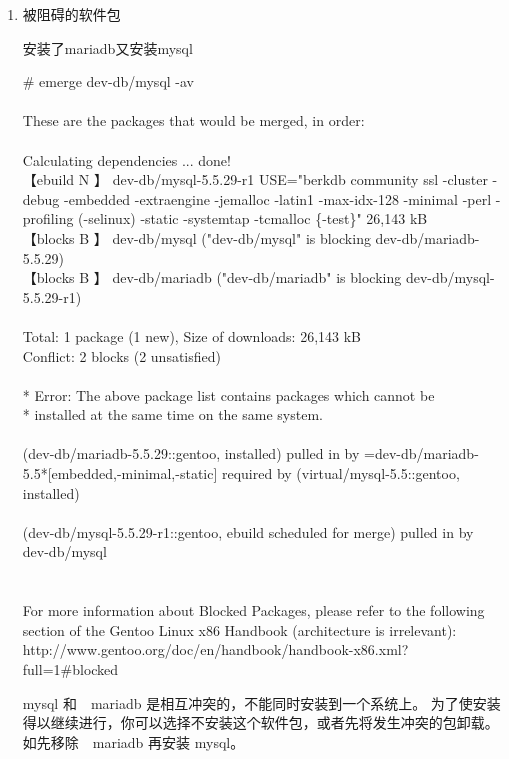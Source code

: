 \begin{enumerate}
\item 被阻碍的软件包

\begin{example}{安装了mariadb又安装mysql}


\begin{code}
\# emerge dev-db/mysql -av \\
~\\
These are the packages that would be merged, in order:\\
~\\
Calculating dependencies     ... done!\\
【ebuild  N     】 dev-db/mysql-5.5.29-r1 USE="berkdb community ssl -cluster -debug -embedded -extraengine -jemalloc -latin1 -max-idx-128 -minimal -perl -profiling (-selinux) -static -systemtap -tcmalloc \{-test\}" 26,143 kB\\
【blocks B      】 dev-db/mysql ("dev-db/mysql" is blocking dev-db/mariadb-5.5.29)\\
【blocks B      】 dev-db/mariadb ("dev-db/mariadb" is blocking dev-db/mysql-5.5.29-r1)\\
~\\
Total: 1 package (1 new), Size of downloads: 26,143 kB\\
Conflict: 2 blocks (2 unsatisfied)\\
~\\
 * Error: The above package list contains packages which cannot be\\
 * installed at the same time on the same system.\\
~\\
  (dev-db/mariadb-5.5.29::gentoo, installed) pulled in by
    =dev-db/mariadb-5.5*[embedded,-minimal,-static] required by (virtual/mysql-5.5::gentoo, installed)\\
~\\
  (dev-db/mysql-5.5.29-r1::gentoo, ebuild scheduled for merge) pulled in by
    dev-db/mysql\\
~\\
~\\
For more information about Blocked Packages, please refer to the following
section of the Gentoo Linux x86 Handbook (architecture is irrelevant):
~\\
http://www.gentoo.org/doc/en/handbook/handbook-x86.xml?full=1\#blocked
\end{code}

mysql 和　mariadb 是相互冲突的，不能同时安装到一个系统上。
为了使安装得以继续进行，你可以选择不安装这个软件包，或者先将发生冲突的包卸载。如先移除　mariadb 再安装 mysql。
\end{example}



\end{enumerate}
